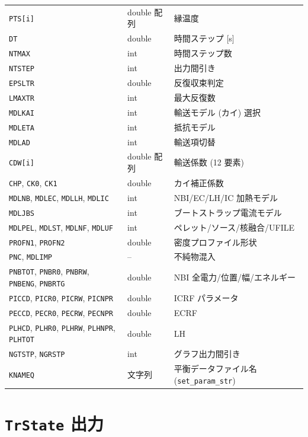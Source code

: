 \documentclass[11pt,a4paper]{report}
\begin{document}
\begin{longtable}{@{}p{3.3cm}p{2.2cm}p{9cm}@{}}
\texttt{PTS[i]}  & double 配列  & 縁温度 \\
\texttt{DT}      & double       & 時間ステップ [s] \\
\texttt{NTMAX}   & int          & 時間ステップ数 \\
\texttt{NTSTEP}  & int          & 出力間引き \\
\texttt{EPSLTR}  & double       & 反復収束判定 \\
\texttt{LMAXTR}  & int          & 最大反復数 \\
\texttt{MDLKAI}  & int          & 輸送モデル (カイ) 選択 \\
\texttt{MDLETA}  & int          & 抵抗モデル \\
\texttt{MDLAD}   & int          & 輸送項切替 \\
\texttt{CDW[i]}  & double 配列  & 輸送係数 (12 要素) \\
\texttt{CHP}, \texttt{CK0}, \texttt{CK1} & double & カイ補正係数 \\
\texttt{MDLNB}, \texttt{MDLEC}, \texttt{MDLLH}, \texttt{MDLIC} & int & NBI/EC/LH/IC 加熱モデル \\
\texttt{MDLJBS}  & int          & ブートストラップ電流モデル \\
\texttt{MDLPEL}, \texttt{MDLST}, \texttt{MDLNF}, \texttt{MDLUF} & int & ペレット/ソース/核融合/UFILE \\
\texttt{PROFN1}, \texttt{PROFN2} & double & 密度プロファイル形状 \\
\texttt{PNC}, \texttt{MDLIMP}    & --      & 不純物混入 \\
\texttt{PNBTOT}, \texttt{PNBR0}, \texttt{PNBRW}, \texttt{PNBENG}, \texttt{PNBRTG} & double & NBI 全電力/位置/幅/エネルギー \\
\texttt{PICCD}, \texttt{PICR0}, \texttt{PICRW}, \texttt{PICNPR} & double & ICRF パラメータ \\
\texttt{PECCD}, \texttt{PECR0}, \texttt{PECRW}, \texttt{PECNPR} & double & ECRF \\
\texttt{PLHCD}, \texttt{PLHR0}, \texttt{PLHRW}, \texttt{PLHNPR}, \texttt{PLHTOT} & double & LH \\
\texttt{NGTSTP}, \texttt{NGRSTP} & int    & グラフ出力間引き \\
\texttt{KNAMEQ}  & 文字列       & 平衡データファイル名 (\texttt{set\_param\_str}) \\ \bottomrule
\end{longtable}

\section{\texttt{TrState} 出力}
\end{document}
